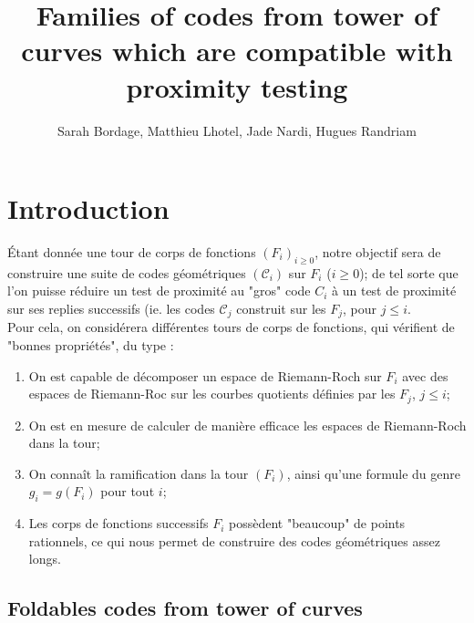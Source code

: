 \documentclass[10pt]{article}
\title{Families of codes from tower of curves which are compatible with proximity testing}
\author{Sarah Bordage, Matthieu Lhotel, Jade Nardi, Hugues Randriam}
\begin{document}
\maketitle

\section{Introduction}

Étant donnée une tour de corps de fonctions $(F_i)_{i \geq 0}$, notre objectif sera de construire une suite de codes géométriques $(\mathcal{C}_i)$ sur $F_i$ ($i \geq 0$); de tel sorte que l'on puisse réduire un test de proximité au "gros" code $C_i$ à un test de proximité sur ses replies successifs (ie. les codes $\mathcal{C}_j$ construit sur les $F_j$, pour $j \leq i$. \\
Pour cela, on considérera différentes tours de corps de fonctions, qui vérifient de "bonnes propriétés", du type :
\begin{enumerate}
\item On est capable de décomposer un espace de Riemann-Roch sur $F_i$ avec des espaces de Riemann-Roc sur les courbes quotients définies par les $F_j$, $j \leq i$;
\item On est en mesure de calculer de manière efficace les espaces de Riemann-Roch dans la tour;
\item On connaît la ramification dans la tour $(F_i)$, ainsi qu'une formule du genre $g_i = g(F_i)$ pour tout $i$;
\item Les corps de fonctions successifs $F_i$ possèdent "beaucoup" de points rationnels, ce qui nous permet de construire des codes géométriques assez longs.
\end{enumerate}

\subsection{Foldables codes from tower of curves}

\end{document}
